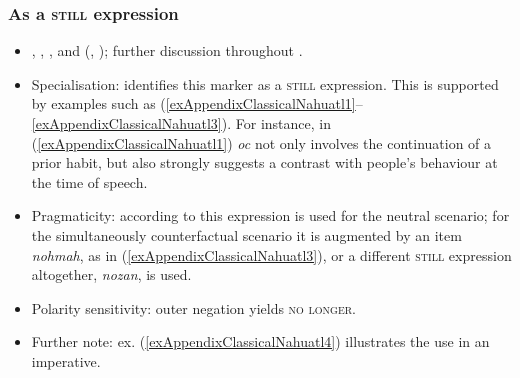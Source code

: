 \subsubsection{As a \textsc{still} expression}
\begin{itemize}
	\sloppy
	\item \textcite[41]{Andrews2003}, \textcite[246]{Bierhorst1985}, \textcite[501]{Carochi1645}, \textcite[175]{Karttunen1992} and \citeauthor{Launey1986} (\citeyear[1261–1622]{Launey1986}, \citeyear[64–65]{LauneyMackay2011}); further discussion throughout \textcite{vanBaar1997}.
	\item Specialisation: \textcite{vanBaar1997} identifies this marker as a \textsc{still} expression. This is supported by examples such as (\ref{exAppendixClassicalNahuatl1}–\ref{exAppendixClassicalNahuatl3}). For instance, in (\ref{exAppendixClassicalNahuatl1}) \textit{oc} not only involves the continuation of a prior habit, but also strongly suggests a contrast with people's behaviour at the time of speech.
	\item Pragmaticity: according to \textcite[76]{vanBaar1997} this expression is used for the neutral scenario; for the simultaneously counterfactual scenario it is augmented by an item \textit{nohmah}, as in (\ref{exAppendixClassicalNahuatl3}), or a different \textsc{still} expression altogether, \textit{nozan}, is used.
	\item Polarity sensitivity: outer negation yields \textsc{no longer}.
	\item Further note: ex. (\ref{exAppendixClassicalNahuatl4}) illustrates the use in an imperative.
\end{itemize}
